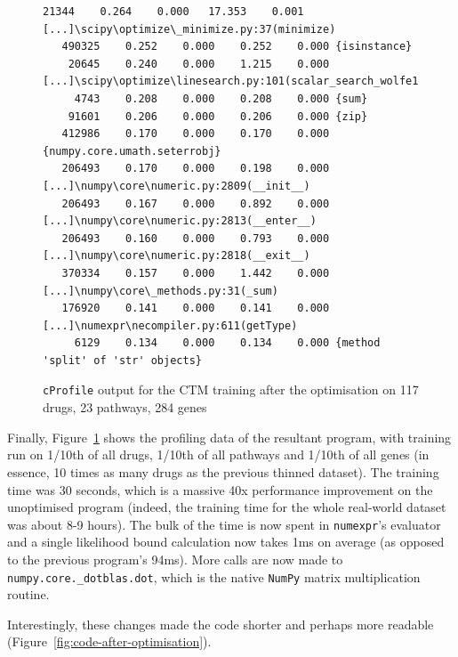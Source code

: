 \documentclass[12pt,a4paper,twoside,openright]{report}
\begin{document}
\begin{figure}
\begin{Verbatim}[fontsize=\scriptsize]
    21344    0.264    0.000   17.353    0.001 [...]\scipy\optimize\_minimize.py:37(minimize)
   490325    0.252    0.000    0.252    0.000 {isinstance}
    20645    0.240    0.000    1.215    0.000 [...]\scipy\optimize\linesearch.py:101(scalar_search_wolfe1)
     4743    0.208    0.000    0.208    0.000 {sum}
    91601    0.206    0.000    0.206    0.000 {zip}
   412986    0.170    0.000    0.170    0.000 {numpy.core.umath.seterrobj}
   206493    0.170    0.000    0.198    0.000 [...]\numpy\core\numeric.py:2809(__init__)
   206493    0.167    0.000    0.892    0.000 [...]\numpy\core\numeric.py:2813(__enter__)
   206493    0.160    0.000    0.793    0.000 [...]\numpy\core\numeric.py:2818(__exit__)
   370334    0.157    0.000    1.442    0.000 [...]\numpy\core\_methods.py:31(_sum)
   176920    0.141    0.000    0.141    0.000 [...]\numexpr\necompiler.py:611(getType)
     6129    0.134    0.000    0.134    0.000 {method 'split' of 'str' objects}
\end{Verbatim}
\caption{\texttt{cProfile} output for the CTM training after the optimisation on 117 drugs, 23 pathways, 284 genes}
\label{fig:ctm-profile-after}
\end{figure}

Finally, Figure~\ref{fig:ctm-profile-after} shows the profiling data of the resultant program, with training run on 1/10th of all drugs, 1/10th of all pathways and 1/10th of all genes (in essence, 10 times as many drugs as the previous thinned dataset). The training time was 30 seconds, which is a massive 40x performance improvement on the unoptimised program (indeed, the training time for the whole real-world dataset was about 8-9 hours). The bulk of the time is now spent in \texttt{numexpr}'s evaluator and a single likelihood bound calculation now takes 1ms on average (as opposed to the previous program's 94ms). More calls are now made to \texttt{numpy.core.\_dotblas.dot}, which is the native \texttt{NumPy} matrix multiplication routine.

Interestingly, these changes made the code shorter and perhaps more readable (Figure~\ref{fig:code-after-optimisation}).
\end{document}
